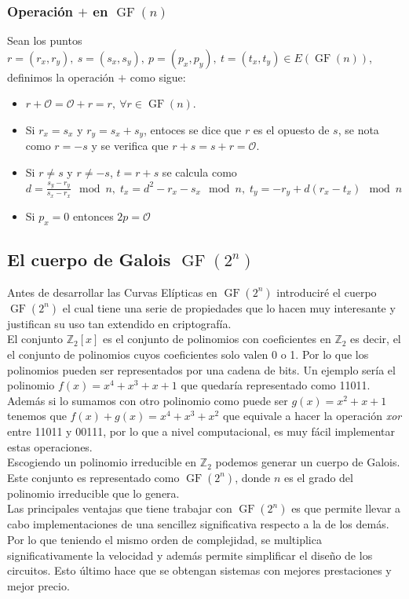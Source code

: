 \begin{aligned*}
\subsubsection{Operación $+$ en $\operatorname{GF}(n)$}
Sean los puntos $r=(r_x,r_y),\: s=(s_x,s_y),\: p=(p_x,p_y),\: t=(t_x,t_y)\in E(\operatorname{GF}(n))$, definimos la operación $+$  como sigue:
\begin{itemize}
	\item $r+\mathcal{O}=\mathcal{O}+r=r,\: \forall r \in \operatorname{GF}(n)$.
	\item Si $r_x=s_x$ y $r_y=s_x+s_y$, entoces se dice que $r$ es el opuesto de $s$, se nota como $r=-s$ y se verifica que $r+s=s+r=\mathcal{O}$.
	\item Si $r\neq s$ y $r\neq-s$, $t=r+s$ se calcula como $d=\frac{s_y-r_y}{s_x-r_x}\mod n,\; t_x=d^2-r_x-s_x \mod n,\; t_y=-r_y+d(r_x-t_x) \mod n$
	\item Si $p_x = 0$ entonces $2p = \mathcal{O}$
\end{itemize}

\subsection{El cuerpo de Galois $\operatorname{GF}(2^n)$}

Antes de desarrollar las Curvas Elípticas en $\operatorname{GF}(2^n)$ introduciré el cuerpo $\operatorname{GF}(2^n)$ el cual tiene una serie de propiedades que lo hacen muy interesante y justifican su uso tan extendido en criptografía.\\
El conjunto $\mathbb{Z}_2[x]$ es el conjunto de polinomios con coeficientes en $\mathbb{Z}_2$ es decir, el el conjunto de polinomios cuyos coeficientes solo valen 0 o 1. Por lo que los polinomios pueden ser representados por una cadena de bits.
 Un ejemplo sería el polinomio $f(x)=x^4+x^3+x+1$ que quedaría representado como 11011. 
Además si lo sumamos con otro polinomio como puede ser $g(x)=x^2+x+1$ tenemos que $f(x)+g(x)=x^4+x^3+x^2$ que equivale a hacer la operación \emph{xor} entre 11011 y 00111, por lo que a nivel computacional, es muy fácil implementar estas operaciones.\\
Escogiendo un polinomio irreducible en $\mathbb{Z}_2$ podemos generar un cuerpo de Galois. Este conjunto es representado como $\operatorname{GF}(2^n)$, donde $n$ es el grado del polinomio irreducible que lo genera.\\
Las principales ventajas que tiene trabajar con $\operatorname{GF}(2^n)$ es que permite llevar a cabo implementaciones de una sencillez significativa respecto a la de los demás. Por lo que teniendo el mismo orden de complejidad, se multiplica significativamente la velocidad y además permite simplificar el diseño de los circuitos. Esto último hace que se obtengan sistemas con mejores prestaciones y mejor precio.


\end{aligned*}
